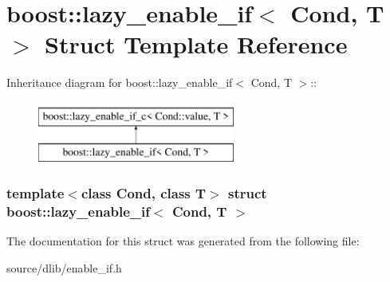 \hypertarget{structboost_1_1lazy__enable__if}{
\section{boost::lazy\_\-enable\_\-if$<$ Cond, T $>$ Struct Template Reference}
\label{structboost_1_1lazy__enable__if}
}
Inheritance diagram for boost::lazy\_\-enable\_\-if$<$ Cond, T $>$::\begin{figure}[H]
\begin{center}
\leavevmode
\includegraphics[height=2cm]{structboost_1_1lazy__enable__if}
\end{center}
\end{figure}
\subsubsection*{template$<$class Cond, class T$>$ struct boost::lazy\_\-enable\_\-if$<$ Cond, T $>$}



The documentation for this struct was generated from the following file:\begin{DoxyCompactItemize}
\item 
source/dlib/enable\_\-if.h\end{DoxyCompactItemize}

